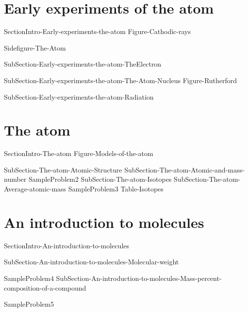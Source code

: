 \documentclass[main.tex]{subfiles}
\newcommand\chapterlabel{Ch-Table}\setcounter{figurenewcounter}{0}\setcounter{tablenewcounter}{0}\setcounter{formulanewcounter}{0}
\begin{document}
 \section{Early experiments of the atom}
{SectionIntro-Early-experiments-the-atom}
    {Figure-Cathodic-rays}

 \sloppy\begin{description}

  {Sidefigure-The-Atom}
\item[\docfilehook{Charge to mass ratio of an electron}{}] {SubSection-Early-experiments-the-atom-TheElectron}

\item[\docfilehook{The atom nucleus}{}] {SubSection-Early-experiments-the-atom-The-Atom-Nucleus}
  {Figure-Rutherford}

\item[\docfilehook{Radiation}{}] {SubSection-Early-experiments-the-atom-Radiation}





  \end{description}
 
\section{The atom}
{SectionIntro-The-atom}
 {Figure-Models-of-the-atom}

\sloppy\begin{description}
{SubSection-The-atom-Atomic-Structure}
{SubSection-The-atom-Atomic-and-mass-number}
{SampleProblem2}
{SubSection-The-atom-Isotopes}
{SubSection-The-atom-Average-atomic-mass}
{SampleProblem3}
 {Table-Isotopes}
\end{description}
\section{An introduction to molecules}
{SectionIntro-An-introduction-to-molecules}
\sloppy
\begin{description}
{SubSection-An-introduction-to-molecules-Molecular-weight}
 
{SampleProblem4}
{SubSection-An-introduction-to-molecules-Mass-percent-composition-of-a-compound}
 
{SampleProblem5}
\end{description}
\end{document}
